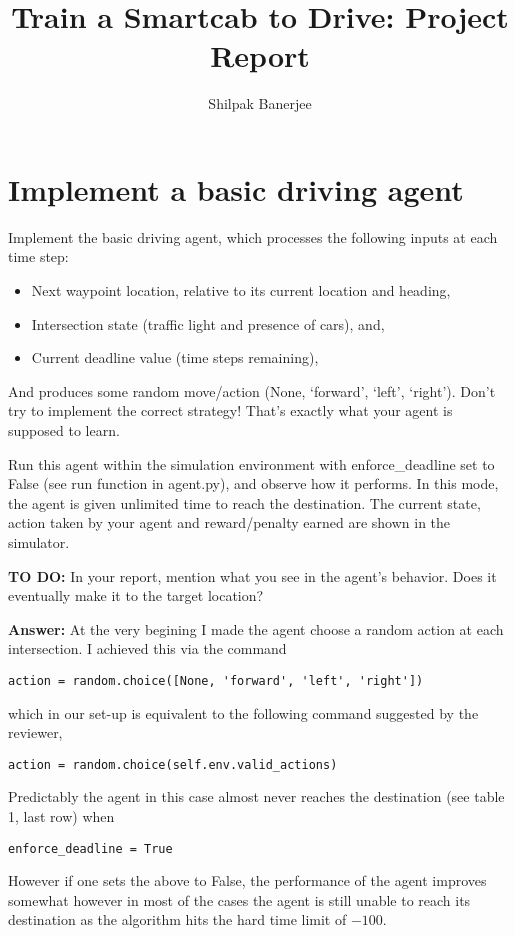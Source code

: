 \documentclass{article}
\title{Train a Smartcab to Drive: Project Report}
\author{Shilpak Banerjee}
\begin{document}
\maketitle


\section{Implement a basic driving agent}

Implement the basic driving agent, which processes the following inputs at each time step:
\begin{itemize}
\item Next waypoint location, relative to its current location and heading,
\item Intersection state (traffic light and presence of cars), and,
\item Current deadline value (time steps remaining),
\end{itemize}
And produces some random move/action (None, `forward', `left', `right'). Don’t try to implement the correct strategy! That’s exactly what your agent is supposed to learn.

Run this agent within the simulation environment with enforce\_deadline set to False (see run function in agent.py), and observe how it performs. In this mode, the agent is given unlimited time to reach the destination. The current state, action taken by your agent and reward/penalty earned are shown in the simulator.

\vspace{.5cm}

\noindent\textbf{TO DO:} In your report, mention what you see in the agent’s behavior. Does it eventually make it to the target location?

\vspace{.2cm}

\noindent\textbf{Answer:}  At the very begining I made the agent choose a random action at each intersection. I achieved this via the command 
\begin{verbatim}
action = random.choice([None, 'forward', 'left', 'right'])
\end{verbatim}
which in our set-up is equivalent to the following command suggested by the reviewer,
\begin{verbatim} 
action = random.choice(self.env.valid_actions)
\end{verbatim}
Predictably the agent in this case almost never reaches the destination (see table 1, last row) when
\begin{verbatim}
enforce_deadline = True
\end{verbatim}
However if one sets the above to False, the performance of the agent improves somewhat however in most of the cases the agent is still unable to reach its destination as the algorithm hits the hard time limit of $-100$.
\end{document}
